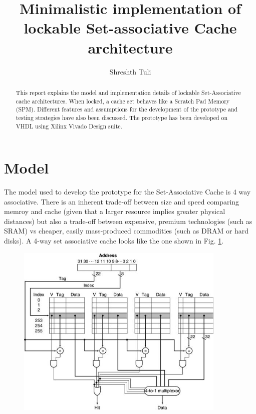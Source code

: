 \documentclass[letterpaper,preprint,11pt]{elsarticle}
\begin{document}
\begin{frontmatter}


\title{Minimalistic implementation of lockable Set-associative Cache architecture}

\author{Shreshth Tuli}

\address{Department of Computer Science, IIT Delhi}

\begin{abstract}
This report explains the model and implementation details of lockable Set-Associative cache architectures. When locked, a cache set behaves like a Scratch Pad Memory (SPM). Different features and assumptions for the development of the prototype and testing strategies have also been discussed. The prototype has been developed on VHDL using Xilinx Vivado Design suite.
\end{abstract}
\end{frontmatter}

\section{Model}
The model used to develop the prototype for the Set-Associative Cache is 4 way associative. There is an inherent trade-off between size and speed comparing memroy and cache (given that a larger resource implies greater physical distances) but also a trade-off between expensive, premium technologies (such as SRAM) vs cheaper, easily mass-produced commodities (such as DRAM or hard disks). A 4-way set associative cache looks like the one shown in Fig. \ref{4-set-cache}.


\begin{figure}[h]
\centering
\includegraphics[width=10cm]{4-way-set-cache}
\label{4-set-cache}
\end{figure}%
\end{document}
